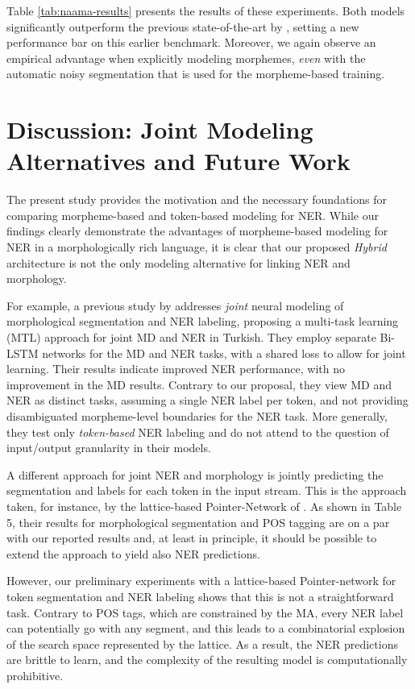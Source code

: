 \documentclass[11pt,a4paper]{article}
\begin{document}
Table \ref{tab:naama-results} presents the results of these experiments. Both  models significantly outperform the previous state-of-the-art by \citet{naama}, setting a new performance bar on this earlier benchmark. Moreover, we again observe an empirical advantage when explicitly modeling morphemes, {\em even} with the automatic noisy segmentation that is used for the morpheme-based training. 


\section{Discussion: Joint Modeling Alternatives and Future Work} 
The present study provides the motivation and the necessary foundations  for comparing morpheme-based and token-based modeling for NER. 
While our findings  clearly demonstrate the advantages of morpheme-based modeling for NER in a morphologically rich language, it is clear  that our proposed {\em Hybrid} architecture is not the only modeling alternative for linking NER and morphology. 

For example, a previous study by \citet{DBLP:gungor-joint-md-ner} addresses {\em joint} neural modeling of morphological segmentation and NER labeling,   proposing a multi-task learning (MTL) approach for joint MD and NER in Turkish. They employ separate Bi-LSTM networks for the MD and NER tasks, with a shared loss to allow for joint learning. Their results indicate improved NER performance, with no improvement in the MD results. 
Contrary to our proposal, they view MD and NER as distinct tasks,  assuming a single NER label per token, and not providing disambiguated morpheme-level boundaries for the NER task. More generally, they test only {\em token-based} NER labeling   and do not attend to the question of input/output  granularity in their models. 


A  different  approach  for  joint  NER  and  morphology is jointly predicting the segmentation and labels for each token in the input stream. This is the approach taken, for instance, by the lattice-based Pointer-Network of \citet{seker-tsarfaty-2020-pointer}. As shown in Table 5, their results for morphological segmentation  and  POS  tagging  are  on  a par  with our  reported  results  and,  at  least  in  principle, it should be possible to extend the \citet{seker-tsarfaty-2020-pointer} approach to yield also NER predictions. 

However, our preliminary experiments with a lattice-based Pointer-network for token segmentation and NER labeling shows that this is not a straightforward task. Contrary to POS tags, which are constrained by the MA, every NER label can potentially go with any  segment, and this leads to a combinatorial explosion of the search space represented by the lattice. As a result, the NER predictions are brittle to learn, and the complexity of the resulting model is computationally prohibitive.
\end{document}
